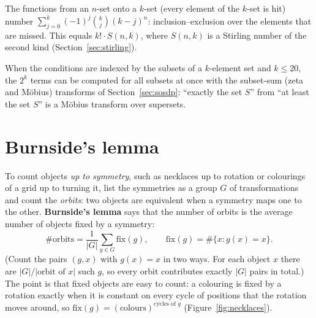 \begin{fact}[Surjections]
The functions from an $n$-set onto a $k$-set (every element of the $k$-set is hit) number $\sum_{j=0}^{k} (-1)^j \binom{k}{j}
(k - j)^n$: inclusion--exclusion over the elements that are missed. This equals $k! \cdot S(n, k)$, where $S(n, k)$ is a Stirling number
of the second kind (Section~\ref{sec:stirling}).
\end{fact}

\begin{trick}
When the conditions are indexed by the subsets of a $k$-element set and $k \le 20$, the $2^k$ terms can be computed for all subsets at
once with the subset-sum (zeta and M\"obius) transforms of Section~\ref{sec:sosdp}: ``exactly the set $S$'' from ``at least the set $S$''
is a M\"obius transform over supersets.
\end{trick}

\section[Burnside's lemma]{Burnside's lemma \hfill \ioi}\label{sec:burnside}

To count objects \emph{up to symmetry}, such as necklaces up to rotation or colourings of a grid up to turning it, list the symmetries
as a group $G$ of transformations and count the \emph{orbits}: two objects are equivalent when a symmetry maps one to the other.
\textbf{Burnside's lemma} says that the number of orbits is the average number of objects fixed by a symmetry:
\[
  \#\text{orbits} = \frac{1}{|G|} \sum_{g \in G} \mathrm{fix}(g), \qquad \mathrm{fix}(g) = \#\{x : g(x) = x\}.
\]
(Count the pairs $(g, x)$ with $g(x) = x$ in two ways. For each object $x$ there are $|G| / |\text{orbit of } x|$ such $g$, so every
orbit contributes exactly $|G|$ pairs in total.) The point is that fixed objects are easy to count: a colouring is fixed by a rotation
exactly when it is constant on every cycle of positions that the rotation moves around, so $\mathrm{fix}(g) = (\text{colours})^{\text{cycles of } g}$ (Figure~\ref{fig:necklaces}).


